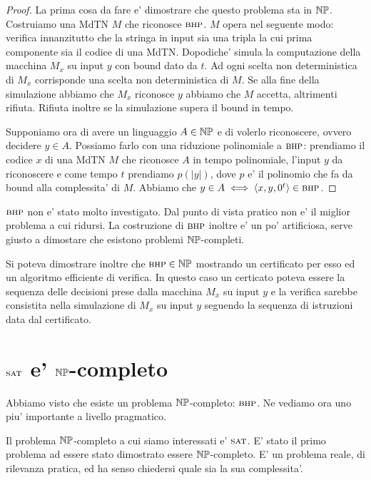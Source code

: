 \begin{proof}
    La prima cosa da fare e' dimostrare che questo problema sta in $\mathbb{NP}$. Costruiamo una MdTN
    $M$ che riconosce $\textsc{bhp}$. $M$ opera nel seguente modo: verifica innanzitutto che la stringa in
    input sia una tripla la cui prima componente sia il codice di una MdTN. Dopodiche' simula la
    computazione della macchina $M_{x}$ su input $y$ con bound dato da $t$. Ad ogni scelta non
    deterministica di $M_{x}$ corrisponde una scelta non deterministica di $M$. Se alla fine della
    simulazione abbiamo che $M_{x}$ riconosce $y$ abbiamo che $M$ accetta, altrimenti rifiuta.
    Rifiuta inoltre se la simulazione supera il bound in tempo.

    Supponiamo ora di avere un linguaggio $A \in \mathbb{NP}$ e di volerlo riconoscere, ovvero decidere
    $y \in A$.  Possiamo farlo con una riduzione polinomiale a $\textsc{bhp}$: prendiamo il codice $x$ di
    una MdTN $M$ che riconosce $A$ in tempo polinomiale, l'input $y$ da riconoscere e come tempo $t$
    prendiamo $p(|y|)$, dove $p$ e' il polinomio che fa da bound alla complessita' di $M$. Abbiamo
    che $y \in A \iff \langle x,y,0^{t} \rangle \in \textsc{bhp}$.
\end{proof}

$\textsc{bhp}$ non e' stato molto investigato. Dal punto di vista pratico non e' il miglior problema a cui
ridursi. La costruzione di $\textsc{bhp}$ inoltre e' un po' artificiosa, serve giusto a dimostare che
esistono problemi $\mathbb{NP}$-completi.

Si poteva dimostrare inoltre che $\textsc{bhp} \in \mathbb{NP}$ mostrando un certificato per esso ed un
algoritmo efficiente di verifica. In questo caso un certicato poteva essere la sequenza delle
decisioni prese dalla macchina $M_{x}$ su input $y$ e la verifica sarebbe consistita nella
simulazione di $M_{x}$ su input $y$ seguendo la sequenza di istruzioni data dal certificato.


\section{$\textsc{sat}$ e' $\mathbb{NP}$-completo}

Abbiamo visto che esiste un problema $\mathbb{NP}$-completo: $\textsc{bhp}$. Ne vediamo ora uno piu' importante
a livello pragmatico.


Il problema $\mathbb{NP}$-completo a cui siamo interessati e' $\textsc{sat}$. E' stato il primo problema ad
essere stato dimostrato essere $\mathbb{NP}$-completo. E' un problema reale, di rilevanza pratica, ed
ha senso chiedersi quale sia la sua complessita'.

